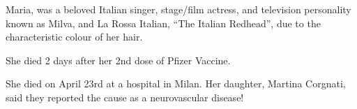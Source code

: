 Maria, was a beloved Italian singer, stage/film actress, and television
personality known as Milva, and La Rossa Italian, “The Italian Redhead”, due to
the characteristic colour of her hair.

She died 2 days after her 2nd dose of Pfizer Vaccine.

She died on April 23rd at a hospital in Milan. Her daughter, Martina Corgnati,
said they reported the cause as a neurovascular disease!

